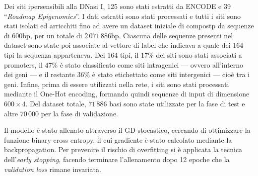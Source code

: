 Dei siti ipersensibili alla DNasi I, 125 sono stati estratti da \acs{ENCODE} e 39 ``\textit{Roadmap Epigenomics}''. I dati estratti sono stati processati e tutti i siti sono stati isolati ed arricchiti fino ad avere un dataset iniziale di compostp da sequenze di 600bp, per un totale di $2\,071\,886$bp. Ciascuna delle sequenze presenti nel dataset sono state poi associate al vettore di label che indicava a quale dei 164 tipi la sequenza apparteneva. Dei 164 tipi, il $17\%$ dei siti sono stati associati a promoters, il $47\%$ è stato classificato come siti intragenici — ovvero all'interno dei geni — e il restante $36\%$ è stato etichettato come siti intergenici — cioè tra i geni. Infine, prima di essere utilizzati nella rete, i siti sono stati processati mediante il One-Hot encoding, formando quindi sequenze di input di dimensione $600\times 4$. Del dataset totale, $71\,886$ basi sono state utilizzate per la fase di test e altre $70\,000$ per la fase di validazione.

Il modello è stato allenato attraverso il \acs{GD} stocastico, cercando di ottimizzare la funzione binary cross entropy, il cui gradiente è stato calcolato mediante la backpropagation. Per prevenire il rischio di overfitting si è applicata la tecnica dell'\textit{early stopping}, facendo terminare l'allenamento dopo 12 epoche che la \textit{validation loss} rimane invariata. %

